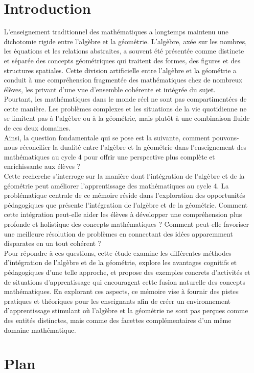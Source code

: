 \def\theme{\large L'Intégration de la Géométrie et de l'Algèbre : Une Approche Unifiée dans l'Enseignement des Mathématiques au Cycle 4}
\def\date{04/11/2023}

\section*{Introduction}

L'enseignement traditionnel des mathématiques a longtemps maintenu une
dichotomie rigide entre l'algèbre et la géométrie. L'algèbre, axée sur les
nombres, les équations et les relations abstraites, a souvent été présentée
comme distincte et séparée des concepts géométriques qui traitent des formes,
des figures et des structures spatiales. Cette division artificielle entre
l'algèbre et la géométrie a conduit à une compréhension fragmentée des
mathématiques chez de nombreux élèves, les privant d'une vue d'ensemble
cohérente et intégrée du sujet.\\

Pourtant, les mathématiques dans le monde réel
ne sont pas compartimentées de cette manière. Les problèmes complexes et les
situations de la vie quotidienne ne se limitent pas à l'algèbre ou à la
géométrie, mais plutôt à une combinaison fluide de ces deux domaines.\\

Ainsi, la question fondamentale qui se pose est la suivante,
comment pouvons-nous réconcilier la dualité entre 
l'algèbre et la géométrie dans l'enseignement des
mathématiques au cycle 4 pour offrir une perspective plus complète et
enrichissante aux élèves ?\\

Cette recherche s'interroge sur la
manière dont l'intégration de l'algèbre et de la géométrie peut améliorer
l'apprentissage des mathématiques au cycle 4. La problématique centrale de ce
mémoire réside dans l'exploration des opportunités pédagogiques que présente
l'intégration de l'algèbre et de la géométrie. Comment cette intégration
peut-elle aider les élèves à développer une compréhension plus profonde et
holistique des concepts mathématiques ? Comment peut-elle favoriser une
meilleure résolution de problèmes en connectant des idées apparemment disparates
en un tout cohérent ?\\

Pour répondre à ces questions, cette étude examine les
différentes méthodes d'intégration de l'algèbre et de la géométrie, explore les
avantages cognitifs et pédagogiques d'une telle approche, et propose des
exemples concrets d'activités et de situations d'apprentissage qui encouragent
cette fusion naturelle des concepts mathématiques. En explorant ces aspects, ce
mémoire vise à fournir des pistes pratiques et théoriques pour les enseignants
afin de créer un environnement d'apprentissage stimulant où l'algèbre et la
géométrie ne sont pas perçues comme des entités distinctes, mais comme des
facettes complémentaires d'un même domaine mathématique.

\newpage
\section*{Plan}

